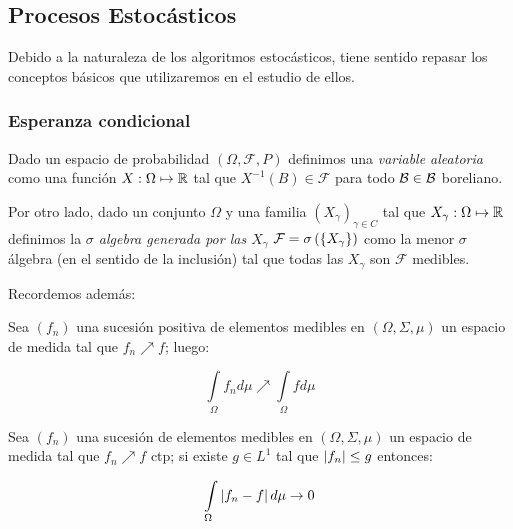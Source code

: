 \subsection{Procesos Estoc\'asticos}

Debido a la naturaleza de los algoritmos estoc\'asticos, tiene sentido repasar los conceptos b\'asicos que utilizaremos en el estudio de ellos.

\subsubsection{Esperanza condicional}

Dado un espacio de probabilidad $\left(\Omega, \mathcal{F}, P\right)$ definimos una \textit{variable aleatoria } como una funci\'on $X : \Omega \mapsto {\mathbb{R}}$ tal que $X^{-1}(B) \in \mathcal{F}$ para todo $\mathcal{B} \in \mathcal{B}$ boreliano.

Por otro lado, dado un conjunto $\Omega$ y una familia $\left(X_{\gamma}\right)_{\gamma \in C}$ tal que $X_{\gamma}: \Omega \mapsto {\mathbb{R}}$ definimos la \textit{$\sigma$ algebra generada por las $X_\gamma$} $\mathcal{F} = \sigma\left(\left\lbrace X_{\gamma}\right\rbrace\right)$ como la menor $\sigma$ \'algebra (en el sentido de la inclusi\'on) tal que todas las $X_{\gamma}$ son $\mathcal{F}$ medibles.

Recordemos adem\'as:

\begin{theorem}
	\label{theorem: Convergencia monotona}
	Sea $(f_n)$ una sucesi\'on positiva de elementos medibles en $(\Omega, \Sigma, \mu)$ un espacio de medida tal que $f_n \nearrow f$; luego:
	
	\begin{equation*}
		\int\limits_{\Omega} {f_n d\mu} \nearrow \int\limits_{\Omega}{f d\mu} 
	\end{equation*} 
\end{theorem}

\begin{theorem}
	\label{theorem: Convergencia dominada}
	Sea $(f_n)$ una sucesi\'on de elementos medibles en $(\Omega, \Sigma, \mu)$ un espacio de medida tal que $f_n \nearrow f$ ctp; si existe $g \in L^1$ tal que $\left\lvert f_n\right\rvert \leq g$ entonces:
	
	\begin{equation*}
	\int\limits_{\Omega} {\left\lvert f_n -f\right\rvert d\mu} \rightarrow 0
	\end{equation*} 
\end{theorem}

